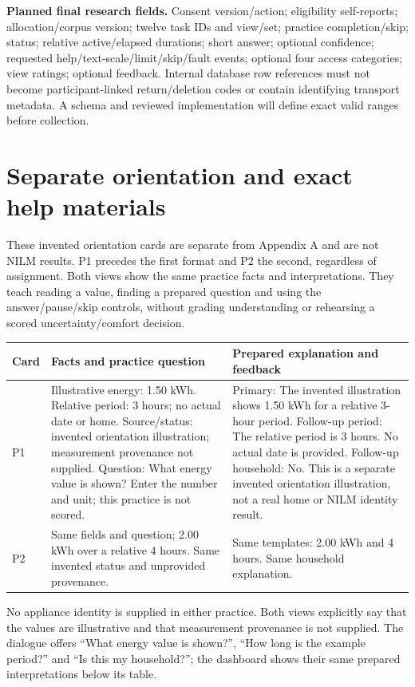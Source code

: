 \documentclass[11pt,letterpaper]{article}
\begin{document}
\textbf{Planned final research fields.} Consent version/action; eligibility self-reports; allocation/corpus version; twelve task IDs and view/set; practice completion/skip; status; relative active/elapsed durations; short answer; optional confidence; requested help/text-scale/limit/skip/fault events; optional four access categories; view ratings; optional feedback. Internal database row references must not become participant-linked return/deletion codes or contain identifying transport metadata. A schema and reviewed implementation will define exact valid ranges before collection.

\section{Separate orientation and exact help materials}\label{app:practice}
These invented orientation cards are separate from Appendix A and are not NILM results. P1 precedes the first format and P2 the second, regardless of assignment. Both views show the same practice facts and interpretations. They teach reading a value, finding a prepared question and using the answer/pause/skip controls, without grading understanding or rehearsing a scored uncertainty/comfort decision.

\begin{longtable}{L{1cm}L{6.6cm}L{6.6cm}}
\toprule
Card & Facts and practice question & Prepared explanation and feedback\\
\midrule
\endhead
P1 & Illustrative energy: 1.50 kWh. Relative period: 3 hours; no actual date or home. Source/status: invented orientation illustration; measurement provenance not supplied. Question: What energy value is shown? Enter the number and unit; this practice is not scored. & Primary: The invented illustration shows 1.50 kWh for a relative 3-hour period. Follow-up period: The relative period is 3 hours. No actual date is provided. Follow-up household: No. This is a separate invented orientation illustration, not a real home or NILM identity result.\\
P2 & Same fields and question; 2.00 kWh over a relative 4 hours. Same invented status and unprovided provenance. & Same templates: 2.00 kWh and 4 hours. Same household explanation.\\
\bottomrule
\end{longtable}
No appliance identity is supplied in either practice. Both views explicitly say that the values are illustrative and that measurement provenance is not supplied. The dialogue offers ``What energy value is shown?'', ``How long is the example period?'' and ``Is this my household?''; the dashboard shows their same prepared interpretations below its table.
\end{document}
